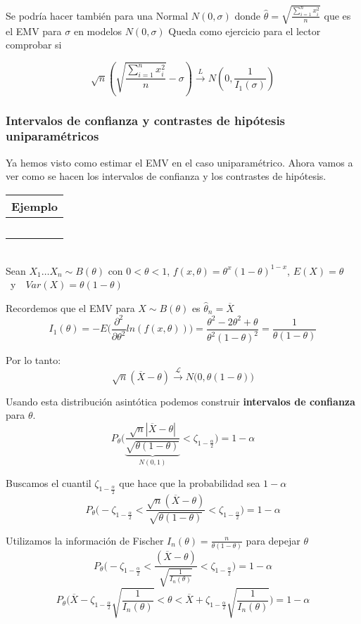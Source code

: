 Se podría hacer también para una Normal $N(0,\sigma)$ donde $\widehat{\theta}=\sqrt{\frac{\sum_{i=1}^{n}x^2_i}{n}}$ que es el EMV para $\sigma$ en modelos $N(0,\sigma)$
Queda como ejercicio para el lector comprobar si

\[
    \sqrt{n}\left(\sqrt{\frac{\sum_{i=1}^{n}x^2_i}{n}}-\sigma\right)\overset{L}{\to}N\left(0,\frac{1}{I_1(\sigma)}\right)
\]
\newpage
\subsubsection{Intervalos de confianza y contrastes de hipótesis uniparamétricos}

Ya hemos visto como estimar el EMV en el caso uniparamétrico. Ahora vamos a ver como se hacen los intervalos de confianza y los contrastes de hipótesis.

\hspace{-1cm}\noindent\begin{tabular}{r}
    \textbf{Ejemplo}  \\ \hline \ \\
\end{tabular}\\
Sean $X_1\dots X_n\sim B(\theta)$ con $0<\theta < 1$, $f(x,\theta)=\theta^x(1-\theta)^{1-x}$, $E(X)=\theta$\ y\ \ $Var(X)=\theta(1-\theta)$

Recordemos que el EMV para $X\sim B(\theta)$ es $\widehat\theta_n=\overline{X}$
$$I_1(\theta)=-E\Big(\frac{\partial^2}{\partial\theta^2}ln(f(x,\theta))\Big)=\frac{\theta^2-2\theta^2+\theta}{\theta^2(1-\theta)^2}=\frac{1}{\theta(1-\theta)}$$

Por lo tanto: 
$$\sqrt{n}(\overline{X}-\theta)\overset{\mathcal{L}}{\longrightarrow}N\big(0,\theta(1-\theta)\big)$$

Usando esta distribución asintótica podemos construir \textbf{intervalos de confianza} para $\theta$.
$$P_\theta\Bigg(\underbrace{\frac{\sqrt{n}|\overline{X}-\theta|}{\sqrt{\theta(1-\theta)}}}_{N(0,1)}<\zeta_{1-\frac{\alpha}{2}}\Bigg)=1-\alpha$$

Buscamos el cuantil $\zeta_{1-\frac{\alpha}{2}}$ que hace que la probabilidad sea $1-\alpha$
$$P_\theta\Bigg(-\zeta_{1-\frac{\alpha}{2}}<\frac{\sqrt{n}(\overline{X}-\theta)}{\sqrt{\theta(1-\theta)}}<\zeta_{1-\frac{\alpha}{2}}\Bigg)=1-\alpha$$

Utilizamos la información de Fischer $I_n(\theta)=\frac{n}{\theta(1-\theta)}$ para depejar $\theta$
$$P_\theta\Bigg(-\zeta_{1-\frac{\alpha}{2}}<\frac{(\overline{X}-\theta)}{\sqrt{\frac{1}{I_n(\theta)}}}<\zeta_{1-\frac{\alpha}{2}}\Bigg)=1-\alpha$$
$$P_\theta\Bigg(\overline{X}-\zeta_{1-\frac{\alpha}{2}}\sqrt{\frac{1}{I_n(\theta)}}<\theta<\overline{X}+\zeta_{1-\frac{\alpha}{2}}\sqrt{\frac{1}{I_n(\theta)}}\Bigg)=1-\alpha$$

